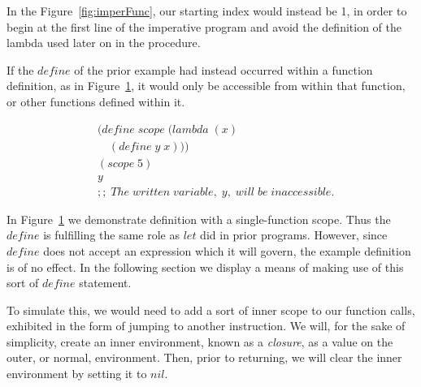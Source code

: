 In the Figure~\ref{fig:imperFunc}, our starting index would instead be 1, in
order to begin at the first line of the imperative program and avoid the
definition of the lambda used later on in the procedure.

If the $define$ of the prior example had instead occurred within a function
definition, as in Figure~\ref{fig:strictScopeExample}, it would only be
accessible from within that function, or other functions defined within it.

\begin{figure}[htp]
\footnotesize
\caption{}\label{fig:strictScopeExample}
\begin{align*}
& (define \; scope \; (lambda \; (x)
\\& \quad (define \; y \; x)))
\\& (scope \; 5)
\\& y
\\& ;; \; The \; written \; variable, \; y, \; will \; be \; inaccessible.
\end{align*}
\end{figure}

In Figure~\ref{fig:strictScopeExample} we demonstrate definition with a
single-function scope. Thus the $define$ is fulfilling the same role as $let$
did in prior programs. However, since $define$ does not accept an expression
which it will govern, the example definition is of no effect. In the following
section we display a means of making use of this sort of $define$ statement.

To simulate this, we would need to add a sort of inner scope to our function calls, 
exhibited in the form of jumping to another instruction. We will, for the sake of
simplicity, create an inner environment, known as a \emph{closure}, as a value on the
outer, or normal, environment. Then, prior to returning, we will clear the inner 
environment by setting it to $nil$.

